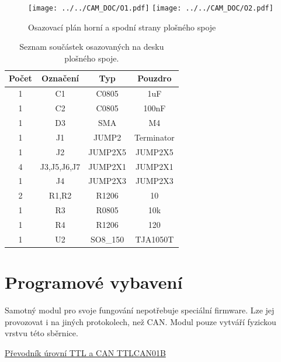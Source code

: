 \documentclass[12pt,a4paper,oneside]{article}
\begin{document}
\begin{figure} [h!tbp]
  \centering
  \texttt{[image: ../../CAM\_DOC/O1.pdf]}
  \texttt{[image: ../../CAM\_DOC/O2.pdf]}
  \caption{Osazovací plán horní a spodní strany plošného spoje}
  \label{fig:osazovaci_plan}
\end{figure}

\begin{savenotes}
\begin{table}[h!]
\begin{center}
\begin{tabular}{ |c|c|c|c| }
\hline 
Počet & Označení & Typ  & Pouzdro  \\ 
\hline 
1	&	C1	&	C0805	&	1uF	\\
1	&	C2	&	C0805	&	100nF	\\
1	&	D3	&	SMA	&	M4 \\
1	&	J1	&	JUMP2	&	Terminator	\\
1	&	J2	&	JUMP2X5	&	JUMP2X5	\\
4	&	J3,J5,J6,J7	&	JUMP2X1	&	JUMP2X1	\\
1	&	J4	&	JUMP2X3	&	JUMP2X3	\\
2	&	R1,R2	&	R1206	&	10	\\
1	&	R3	&	R0805	&	10k	\\
1	&	R4	&	R1206	&	120	\\
1	&	U2	&	SO8\_150	&	TJA1050T	\\
\hline 
\end{tabular}
\end{center}
\caption{Seznam součástek osazovaných na desku plošného spoje.}
\label{seznam_soucastek_galvanic_isolation}
\end{table}
\end{savenotes}



\section{Programové vybavení}

Samotný modul pro svoje fungování nepotřebuje speciální firmware. Lze jej provozovat i na jiných protokolech, než CAN. Modul pouze vytváří fyzickou vrstvu této sběrnice.

\begin{thebibliography}{99}
\href{http://wiki.mlab.cz/doku.php?id=cs:ttlcan}{Převodník úrovní TTL a CAN TTLCAN01B}

\end{thebibliography}
\end{document}
